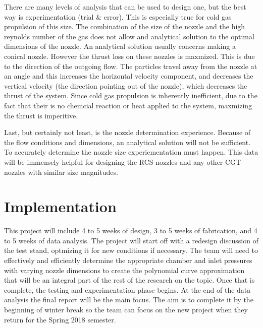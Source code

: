 \documentclass[conference]{IEEEtran} %
\begin{document}
There are many levels of
analysis that can be used to design one, but the best way is experimentation (trial \& error)\cite{RPE}. This is especially true for cold gas propulsion of this
size. The combination of the size of the nozzle and the high reynolds number of the gas does not allow and analytical solution to the optimal dimensions
of the nozzle. An analytical solution usually concerns making a conical nozzle. However the thrust loss on these nozzles is maxmized. This is due to the
direction of the outgoing flow. The particles travel away from the nozzle at an angle and this increases the horizontal velocity component, and decreases the
vertical velocity (the direction pointing out of the nozzle), which decreases the thrust of the system\cite{SPAD}. Since cold gas propulsion is inherently inefficient, due
to the fact that their is no chemcial reaction or heat applied to the system, maxmizing the thrust is imperitive.

Last, but certainly not least, is the nozzle determination experience. Because of the flow conditions and dimensions, an analytical solution will not be sufficient. To accurately determine
the nozzle size experiementation must happen. This data will be immensely helpful for designing the RCS nozzles and any other CGT nozzles with similar
size magnitudes.


\section{Implementation}
\label{sec:implementation}

This project will include 4 to 5 weeks of design, 3 to 5 weeks of fabrication, and 4 to 5 weeks of data analysis. The project will start off with a redesign discussion of the test stand, optmizing it for new conditions if necessary.
The team will need to effectively and efficiently determine the appropriate chamber and inlet pressures with varying
nozzle dimensions to create the polynomial curve approximation that will be an integral part of the rest of the research on the topic. Once that is complete, the
testing and experimentation phase begins. At the end of the data analysis the final report will be the main focus. The aim is to complete it by the beginning of winter break
so the team can focus on the new project when they return for the Spring 2018 semester.
\end{document}
